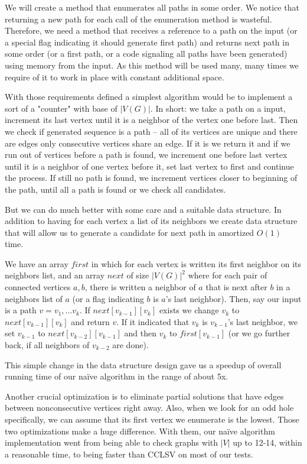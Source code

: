 We will create a method that enumerates all paths in some order. We notice that returning a new path for each call of the enumeration method is wasteful. Therefore, we need a method that receives a reference to a path on the input (or a special flag indicating it should generate first path) and returns next path in some order (or a first path, or a code signaling all paths have been generated) using memory from the input. As this method will be used many, many times we require of it to work in place with constant additional space.

With those requirements defined a simplest algorithm would be to implement a sort of a "counter" with base of $|V(G)|$. In short: we take a path on a input, increment its last vertex until it is a neighbor of the vertex one before last. Then we check if generated sequence is a path -- all of its vertices are unique and there are edges only consecutive vertices share an edge. If it is we return it and if we run out of vertices before a path is found, we increment one before last vertex until it is a neighbor of one vertex before it, set last vertex to first and continue the process. If still no path is found, we increment vertices closer to beginning of the path, until all a path is found or we check all candidates.

But we can do much better with some care and a suitable data structure. In addition to having for each vertex a list of its neighbors we create data structure that will allow us to generate a candidate for next path in amortized $O(1)$ time.

We have an array $first$ in which for each vertex is written its first neighbor on its neighbors list, and an array $next$ of size $|V(G)|^2$ where for each pair of connected vertices $a, b$, there is written a neighbor of $a$ that is next after $b$ in a neighbors list of $a$ (or a flag indicating $b$ is $a$'s last neighbor). Then, say our input is a path $v = v_1, \ldots v_k$. If $next[v_{k-1}][v_k]$ exists we change $v_k$ to $next[v_{k-1}][v_k]$ and return $v$. If it indicated that $v_k$ is $v_{k-1}$'s last neighbor, we set $v_{k-1}$ to $next[v_{k-2}][v_{k-1}]$ and then $v_k$ to $first[v_{k-1}]$ (or we go further back, if all neighbors of $v_{k-2}$ are done).

This simple change in the data structure design gave us a speedup of overall running time of our na\"ive algorithm in the range of about 5x.

Another crucial optimization is to eliminate partial solutions that have edges between nonconsecutive vertices right away. Also, when we look for an odd hole specifically, we can assume that its first vertex we enumerate is the lowest. Those two optimizations make a huge difference. With them, our na\"ive algorithm implementation went from being able to check graphs with $|V|$ up to 12-14, within a reasonable time, to being faster than CCLSV on most of our tests.


